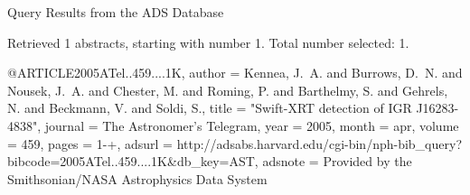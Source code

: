Query Results from the ADS Database


Retrieved 1 abstracts, starting with number 1.  Total number selected: 1.

@ARTICLE{2005ATel..459....1K,
   author = {{Kennea}, J.~A. and {Burrows}, D.~N. and {Nousek}, J.~A. and 
	{Chester}, M. and {Roming}, P. and {Barthelmy}, S. and {Gehrels}, N. and 
	{Beckmann}, V. and {Soldi}, S.},
    title = "{Swift-XRT detection of IGR J16283-4838}",
  journal = {The Astronomer's Telegram},
     year = 2005,
    month = apr,
   volume = 459,
    pages = {1-+},
   adsurl = {http://adsabs.harvard.edu/cgi-bin/nph-bib_query?bibcode=2005ATel..459....1K&db_key=AST},
  adsnote = {Provided by the Smithsonian/NASA Astrophysics Data System}
}


